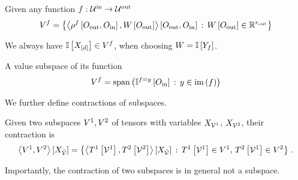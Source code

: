 \begin{definition}
    Given any function $f:\mathcal{U}^{\mathrm{in}}\rightarrow\mathcal{U}^{\mathrm{out}}$
    \begin{align*}
        V^{f}
        = \left\{ \left\langle 
            \rho^{f}\left[O_{\mathrm{out}},O_{\mathrm{in}}\right],W\left[O_{\mathrm{out}}\right]
            \right\rangle \left[ O_{\mathrm{out}},O_{\mathrm{in}} \right] \, : \, W\left[O_{\mathrm{out}}\right] \in \mathbb{R}^{r_{\mathrm{out}}}
        \right\}
    \end{align*}
\end{definition}
We always have $\mathbb{I}\left[X_{[d]}\right]\in V^{f}$, when choosing $W=\mathbb{I}\left[Y_{f}\right]$.

A value subspace of its function
\begin{align*}
    V^{f}
    = \mathrm{span}\left(\mathbb{I}^{f=y}\left[O_{\mathrm{in}}\right] \, : \, y\in\mathrm{im}\left(f\right)\right)
\end{align*}

We further define contractions of subspaces.

\begin{definition}
    Given two subspaces $V^{1},V^{2}$ of tensors with variables $X_{\mathcal{V}^{1}}$, $X_{\mathcal{V}^{2}}$, their contraction is
    \begin{align*}
        \left\langle V^{1},V^{2}\right\rangle \left[ X_{\tilde{\mathcal{V}}} \right]
        = \left\{ \left\langle T^{1}\left[\mathcal{V}^{1}\right],T^{2}\left[\mathcal{V}^{2}\right]\right\rangle \left[ X_{\tilde{\mathcal{V}}} \right]
        \, : \, T^{1}\left[\mathcal{V}^{1}\right]\in V^{1}, \, T^{2}\left[\mathcal{V}^{1}\right]\in V^{2} \right\} \, .
    \end{align*}
\end{definition}

Importantly, the contraction of two subspaces is in general not a subspace.


